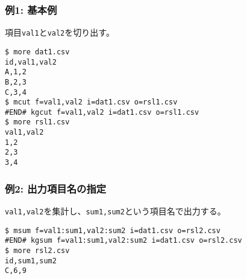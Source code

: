 \subsubsection*{例1: 基本例}

項目\verb|val1|と\verb|val2|を切り出す。


\begin{Verbatim}[baselinestretch=0.7,frame=single]
$ more dat1.csv
id,val1,val2
A,1,2
B,2,3
C,3,4
$ mcut f=val1,val2 i=dat1.csv o=rsl1.csv
#END# kgcut f=val1,val2 i=dat1.csv o=rsl1.csv
$ more rsl1.csv
val1,val2
1,2
2,3
3,4
\end{Verbatim}
\subsubsection*{例2: 出力項目名の指定}

\verb|val1,val2|を集計し、\verb|sum1,sum2|という項目名で出力する。


\begin{Verbatim}[baselinestretch=0.7,frame=single]
$ msum f=val1:sum1,val2:sum2 i=dat1.csv o=rsl2.csv
#END# kgsum f=val1:sum1,val2:sum2 i=dat1.csv o=rsl2.csv
$ more rsl2.csv
id,sum1,sum2
C,6,9
\end{Verbatim}
